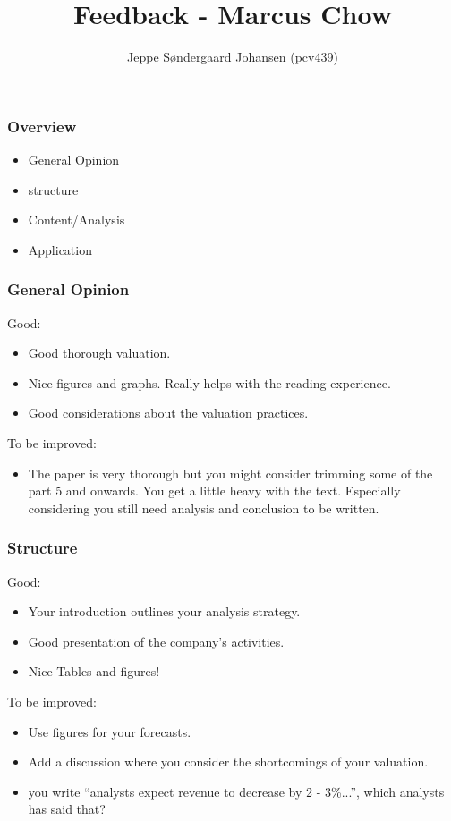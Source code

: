 \documentclass{beamer}
\title{Feedback - Marcus Chow}
\author{Jeppe Søndergaard Johansen (pcv439)}
\begin{document}
\maketitle


\begin{frame}
\frametitle{Overview}

\begin{itemize}
    \item General Opinion
    \item structure
    \item Content/Analysis
    \item Application
\end{itemize}

\end{frame}

\begin{frame}
\frametitle{General Opinion}

Good:

\begin{itemize}
    \item Good thorough valuation.
    \item Nice figures and graphs. Really helps with the reading experience.
    \item Good considerations about the valuation practices.
\end{itemize}

To be improved:

\begin{itemize}
    \item The paper is very thorough but you might consider trimming some of the part 5 and onwards. You get a little heavy with the text. Especially considering you still need analysis and conclusion to be written.
\end{itemize}

\end{frame}

\begin{frame}
\frametitle{Structure}

Good:

\begin{itemize}
    \item Your introduction outlines your analysis strategy.
    \item Good presentation of the company's activities.
    \item Nice Tables and figures!\end{itemize}

To be improved:

\begin{itemize}
    \item Use figures for your forecasts.
    \item Add a discussion where you consider the shortcomings of your valuation.
    \item you write ``analysts expect revenue to decrease by 2 - 3\%...'', which analysts has said that?
\end{itemize}

\end{frame}
\end{document}
